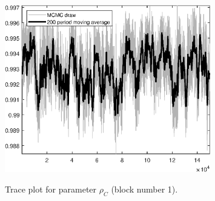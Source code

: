 \begin{figure}[H]
\centering
  \includegraphics[width=0.8\textwidth]{BRS_gen/graphs/TracePlot_rho_C_blck_1}\\
    \caption{Trace plot for parameter ${\rho_C}$ (block number 1).}
\end{figure}

